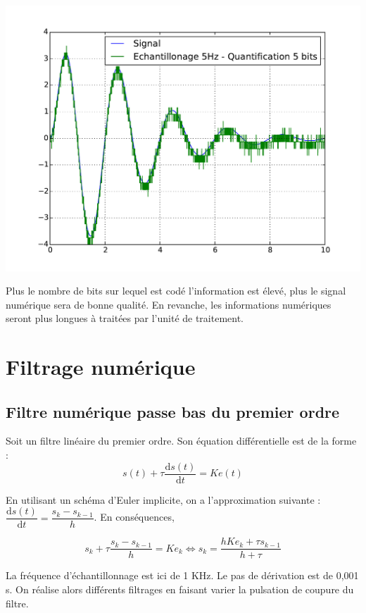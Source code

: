 \documentclass[10pt,fleqn]{article} %
\begin{document}
\begin{minipage}[c]{.32\linewidth}
\begin{center}
\includegraphics[width=\textwidth]{images/quan_3}
\end{center}
\end{minipage}

Plus le nombre de bits sur lequel est codé l'information est élevé, plus le signal numérique sera de bonne qualité. En revanche, les informations numériques seront plus longues à traitées par l'unité de traitement.

\section{Filtrage numérique}
\subsection{Filtre numérique passe bas du premier ordre}
Soit un filtre linéaire du premier ordre. Son équation différentielle est de la forme :
$$
s(t)+\tau \dfrac{\text{d} s(t) }{\text{d}t} = K e(t)
$$

En utilisant un schéma d'Euler implicite, on a l'approximation suivante : $\dfrac{\text{d} s(t) }{\text{d}t} = \dfrac{s_{k}-s_{k-1}}{h}$. En conséquences, 

$$
s_k+\tau \dfrac{s_{k}-s_{k-1}}{h} = K e_k \Leftrightarrow 
s_k = \dfrac{h K e_k+\tau s_{k-1}}{h+\tau}
$$

La fréquence d'échantillonnage est ici de 1 KHz. Le pas de dérivation est de 0,001 s. On réalise alors différents filtrages en faisant varier la pulsation de coupure du filtre. 
\end{document}
